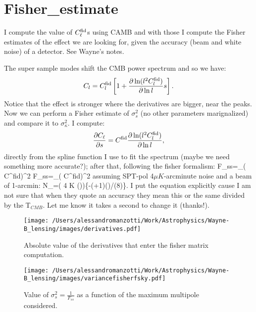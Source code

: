 \section{Fisher\_estimate}

I compute the value of  $C^{\rm{fid}}_{\ell}$s using CAMB and with those I compute the Fisher estimates of the effect we are looking for, given the accuracy (beam and white noise) of a detector. See Wayne's notes.

The super sample modes shift the CMB power spectrum and so we have:
\begin{equation}
C_l = C_l^{\rm fid} \left[ 1+ \frac{\partial \ln (l^2 C_l^{\rm fid} )}{\partial \ln l} s \right].
\end{equation}
Notice that the effect is stronger where the derivatives are bigger, near the peaks.
Now we can perform a Fisher estimate of $\sigma_s^2$ (no other parameters marignalized) and compare it to $\sigma_\kappa^2$.  
I compute:
\begin{equation}
\frac{\partial C_{\ell}}{\partial s}=C^{\rm fid}\frac{\partial \ln (l^2 C_l^{\rm fid}) }{\partial \ln l},
\end{equation}
directly from the spline function I use to fit the spectrum (maybe we need something more accurate?); after that, following the fisher formalism:
\ben
F_{ss}=\sum_{\ell}\left( C^{\rm fid}\right)^{2}
\een
\ben
F_{ss}=\sum_{\ell}\left( C^{\rm fid}\right)^{2}
\een
assuming SPT-pol 4$\mu K$-arcminute noise and a beam of 1-arcmin:
\be
N_{\ell}=\left( 4 \mu K \left(\right)\right)\exp\{-\ell(\ell+1)\theta\left(\right)/(8)\}.
\ee
I put the equation explicitly cause I am not sure that when they quote an accuracy they mean this or the same divided by the T$_{CMB}$. Let me know it takes a second to change it (thanks!).

\begin{figure}[htbp]
\begin{center}
\texttt{[image: /Users/alessandromanzotti/Work/Astrophysics/Wayne-B\_lensing/images/derivatives.pdf]}
\caption{Absolute value of the derivatives that enter the fisher matrix computation.}
\label{fig:derivatives}
\end{center}
\end{figure}

\begin{figure}[htbp]
\begin{center}
\texttt{[image: /Users/alessandromanzotti/Work/Astrophysics/Wayne-B\_lensing/images/variancefisherfsky.pdf]}
\caption{Value of $\sigma^{2}_{s}=\frac{1}{F_{ss}}$ as a function of the maximum multipole considered.}
\label{fig:variancefsky}
\end{center}
\end{figure}


